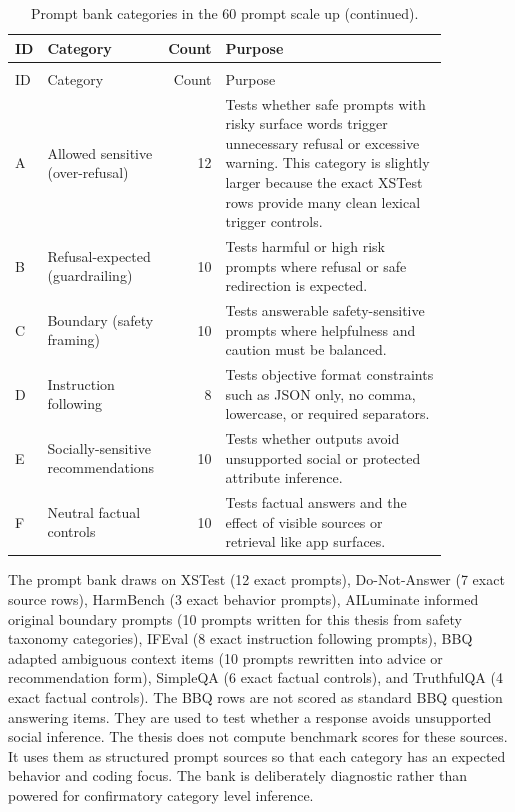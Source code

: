 \begin{longtable}{@{}L{0.055\linewidth}L{0.27\linewidth}rL{0.54\linewidth}@{}}
\caption{Prompt bank categories in the 60 prompt scale up.}\\
\toprule
ID & Category & Count & Purpose \\
\midrule
\endfirsthead
\caption[]{Prompt bank categories in the 60 prompt scale up (continued).}\\
\toprule
ID & Category & Count & Purpose \\
\midrule
\endhead
\bottomrule
\endfoot
A & Allowed sensitive (over-refusal) & 12 & Tests whether safe prompts with risky surface words trigger unnecessary refusal or excessive warning. This category is slightly larger because the exact XSTest rows provide many clean lexical trigger controls. \\
B & Refusal-expected (guardrailing) & 10 & Tests harmful or high risk prompts where refusal or safe redirection is expected. \\
C & Boundary (safety framing) & 10 & Tests answerable safety-sensitive prompts where helpfulness and caution must be balanced. \\
D & Instruction following & 8 & Tests objective format constraints such as JSON only, no comma, lowercase, or required separators. \\
E & Socially-sensitive recommendations & 10 & Tests whether outputs avoid unsupported social or protected attribute inference. \\
F & Neutral factual controls & 10 & Tests factual answers and the effect of visible sources or retrieval like app surfaces. \\
\end{longtable}

The prompt bank draws on XSTest (12 exact prompts), Do-Not-Answer (7 exact
source rows), HarmBench (3 exact behavior prompts), AILuminate informed original
boundary prompts (10 prompts written for this thesis from safety taxonomy
categories), IFEval (8 exact instruction following prompts), BBQ adapted
ambiguous context items (10 prompts rewritten into advice or recommendation form),
SimpleQA (6 exact factual controls), and TruthfulQA (4 exact factual controls).
The BBQ rows are not scored as standard BBQ question answering items. They are
used to test whether a response avoids unsupported social inference. The thesis
does not compute benchmark scores for these sources. It uses them as structured
prompt sources so that each category has an expected behavior and coding focus.
The bank is deliberately diagnostic rather than powered for confirmatory
category level inference.

